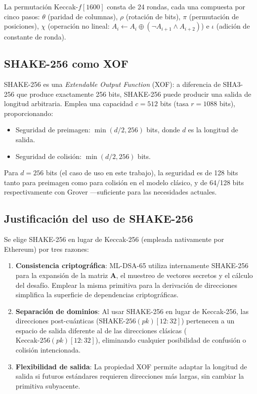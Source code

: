 La permutación Keccak-$f[1600]$ consta de 24 rondas, cada una compuesta por cinco pasos: $\theta$ (paridad de columnas), $\rho$ (rotación de bits), $\pi$ (permutación de posiciones), $\chi$ (operación no lineal: $A_i \gets A_i \oplus (\neg A_{i+1} \wedge A_{i+2})$) e $\iota$ (adición de constante de ronda).

\subsection{SHAKE-256 como XOF}

SHAKE-256 es una \emph{Extendable Output Function} (XOF): a diferencia de SHA3-256 que produce exactamente 256 bits, SHAKE-256 puede producir una salida de longitud arbitraria. Emplea una capacidad $c = 512$ bits (tasa $r = 1088$ bits), proporcionando:
\begin{itemize}
  \item Seguridad de preimagen: $\min(d/2, 256)$ bits, donde $d$ es la longitud de salida.
  \item Seguridad de colisión: $\min(d/2, 256)$ bits.
\end{itemize}

Para $d = 256$ bits (el caso de uso en este trabajo), la seguridad es de 128 bits tanto para preimagen como para colisión en el modelo clásico, y de 64/128 bits respectivamente con Grover ---suficiente para las necesidades actuales.

\subsection{Justificación del uso de SHAKE-256}

Se elige SHAKE-256 en lugar de Keccak-256 (empleada nativamente por Ethereum) por tres razones:
\begin{enumerate}
  \item \textbf{Consistencia criptográfica}: ML-DSA-65 utiliza internamente SHAKE-256 para la expansión de la matriz $\mathbf{A}$, el muestreo de vectores secretos y el cálculo del desafío. Emplear la misma primitiva para la derivación de direcciones simplifica la superficie de dependencias criptográficas.
  
  \item \textbf{Separación de dominios}: Al usar SHAKE-256 en lugar de Keccak-256, las direcciones post-cuánticas ($\text{SHAKE-256}(\mathit{pk})[12{:}32]$) pertenecen a un espacio de salida diferente al de las direcciones clásicas ($\text{Keccak-256}(\mathit{pk})[12{:}32]$), eliminando cualquier posibilidad de confusión o colisión intencionada.
  
  \item \textbf{Flexibilidad de salida}: La propiedad XOF permite adaptar la longitud de salida si futuros estándares requieren direcciones más largas, sin cambiar la primitiva subyacente.
\end{enumerate}

